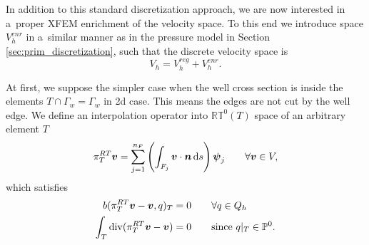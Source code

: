 

In addition to this standard discretization approach, we are now interested in a~proper XFEM enrichment of the velocity space.
To this end we introduce space $V_h^{enr}$ in a~similar manner as in the pressure model in Section \ref{sec:prim_discretization},
such that the discrete velocity space is
\begin{equation}
    V_h = V_h^{reg} + V_h^{enr}.
\end{equation}


At first, we suppose the simpler case when the well cross section is
inside the elements $T\cap\Gamma_w = \Gamma_w$ in 2d case.
This means the edges are not cut by the well edge.
We define an interpolation operator into $\mathbb{RT}^0(T)$ space of an arbitrary element $T$
\begin{equation}
    \pi^{RT}_T\mathbf{\boldsymbol{v}} = \sum_{j=1}^{n_F} \left( \int_{F_j} \mathbf{\boldsymbol{v}} \cdot \mathbf{\boldsymbol{n}} \,{\rm d} s \right)  \mathbf{\boldsymbol{\psi}}_j
    \qquad \forall \mathbf{\boldsymbol{v}} \in V, \label{eqn:local_rt_interpolator}
\end{equation}
which satisfies
\begin{align}
b(\pi^{RT}_T\mathbf{\boldsymbol{v}}- \mathbf{\boldsymbol{v}}, q)_T &= 0 \qquad \forall q\in Q_h\\ 
\int_T {\rm div}(\pi^{RT}_T\mathbf{\boldsymbol{v}}- \mathbf{\boldsymbol{v}}) &= 0 \qquad \textrm{since } q|_T\in \mathbb{P}^0.
\end{align}


